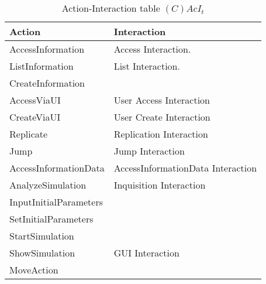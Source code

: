 \begin{table}[H]
	\centering
	\begin{tabular}{|p{4cm}|p{8cm}|}
			\hline
			\textbf{Action} & \textbf{Interaction} \\
			\hline
			AccessInformation & Access Interaction. \\
			\hline
			ListInformation & List Interaction. \\
			\hline
			CreateInformation & \\
			\hline
			AccessViaUI & User Access Interaction \\
			\hline
			CreateViaUI & User Create Interaction \\
			\hline
			Replicate & Replication Interaction \\
			\hline
			Jump & Jump Interaction \\
			\hline
			AccessInformationData & AccessInformationData Interaction \\
			\hline
			AnalyzeSimulation & Inquisition Interaction \\
			\hline
			InputInitialParameters & \\
			\hline
			SetInitialParameters & \\
			\hline
			StartSimulation & \\
			\hline
			ShowSimulation & GUI Interaction \\
			\hline
			MoveAction & \\
			\hline
		\end{tabular}
	\caption{Action-Interaction table $(C)AcI_t$}
	\label{tab:cacit}
\end{table}

